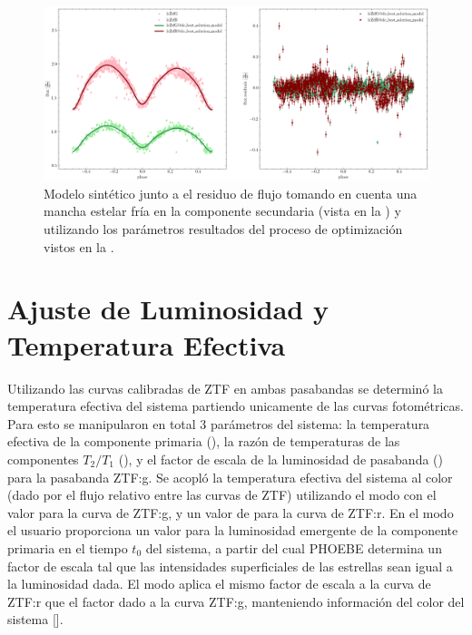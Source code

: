 \begin{figure}[!ht]
	\centering
	\includegraphics[scale=0.45]{Metodologia/Secciones/ModeloComputacional/Figures/Figura Opt DC Resultados ZTF.png}
	\caption{Modelo sintético junto a el residuo de flujo tomando en cuenta una
	mancha estelar fría en la componente secundaria (vista en la
	) y utilizando los parámetros resultados del
	proceso de optimización vistos en la .}
	\label{figuraOptDcResultadosZtf}
\end{figure}

\section{Ajuste de Luminosidad y Temperatura Efectiva} \label{metodologia:modelocomputacional:ajuste_luminosidad_teff}

Utilizando las curvas calibradas de ZTF en ambas pasabandas se determinó la
temperatura efectiva del sistema partiendo unicamente de las curvas
fotométricas. Para esto se manipularon en total 3 parámetros del sistema: la
temperatura efectiva de la componente primaria (), la razón
de temperaturas de las componentes $T_2 / T_1$ (), y el factor
de escala de la luminosidad de pasabanda () para la
pasabanda ZTF:g. Se acopló la temperatura efectiva del sistema al color (dado
por el flujo relativo entre las curvas de ZTF) utilizando el modo
 con el valor  para la curva de ZTF:g,
y un valor de  para la curva de ZTF:r. En el modo
 el usuario proporciona un valor para la luminosidad
emergente de la componente primaria en el tiempo $t_0$ del sistema, a partir del
cual PHOEBE determina un factor de escala tal que las intensidades superficiales
de las estrellas sean igual a la luminosidad dada. El modo
 aplica el mismo factor de escala a la curva de ZTF:r que
el factor dado a la curva ZTF:g, manteniendo información del color del sistema
[]. 

